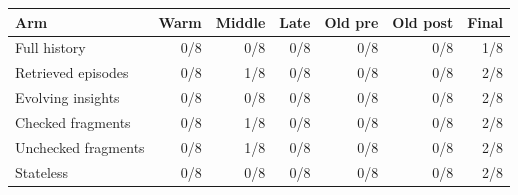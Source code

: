 \begin{tabular}{lrrrrrr}
\toprule
Arm & Warm & Middle & Late & Old pre & Old post & Final \\
\midrule
Full history & 0/8 & 0/8 & 0/8 & 0/8 & 0/8 & 1/8 \\
Retrieved episodes & 0/8 & 1/8 & 0/8 & 0/8 & 0/8 & 2/8 \\
Evolving insights & 0/8 & 0/8 & 0/8 & 0/8 & 0/8 & 2/8 \\
Checked fragments & 0/8 & 1/8 & 0/8 & 0/8 & 0/8 & 2/8 \\
Unchecked fragments & 0/8 & 1/8 & 0/8 & 0/8 & 0/8 & 2/8 \\
Stateless & 0/8 & 0/8 & 0/8 & 0/8 & 0/8 & 2/8 \\
\bottomrule
\end{tabular}
